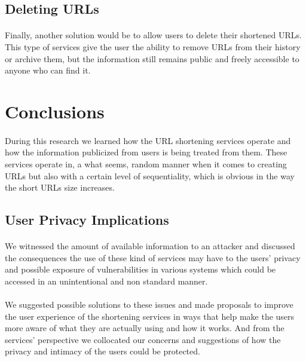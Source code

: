 \documentclass[12pt]{article}
\begin{document}
\subsection{Deleting URLs}

\paragraph{}
Finally, another solution would be to allow users to delete their shortened URLs. This type of services give the user the ability to remove URLs from their history or archive them, but the information still remains public and freely accessible to anyone who can find it.

\section{Conclusions}

\paragraph{}
During this research we learned how the URL shortening services operate and how the information publicized from users is being treated from them. These services operate in, a what seems, random manner when it comes to creating URLs but also with a certain level of sequentiality, which is obvious in the way the short URLs size increases.

\subsection{User Privacy Implications}

\paragraph{}
We witnessed the amount of available information to an attacker and discussed the consequences the use of these kind of services may have to the users' privacy and possible exposure of vulnerabilities in various systems which could be accessed in an unintentional and non standard manner.

\paragraph{}
We suggested possible solutions to these issues and made proposals to improve the user experience of the shortening services in ways that help make the users more aware of what they are actually using and how it works. And from the services' perspective we collocated our concerns and suggestions of how the privacy and intimacy of the users could be protected.
\end{document}
